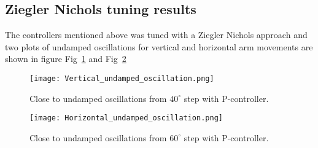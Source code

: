 \subsection{Ziegler Nichols tuning results}
The controllers mentioned above was tuned with a Ziegler Nichols approach and two plots of undamped oscillations for vertical and horizontal arm movements are shown in figure Fig~\ref{vert_osc} and Fig~\ref{Hor_osc}
\begin{figure}[H]
\centering
\texttt{[image: Vertical\_undamped\_oscillation.png]}
\caption{Close to undamped oscillations from \(40^{\circ}\) step with P-controller.}
\label{vert_osc}
\end{figure}
\begin{figure}[H]
\centering
\texttt{[image: Horizontal\_undamped\_oscillation.png]}
\caption{Close to undamped oscillations from \(60^{\circ}\) step with P-controller.}
\label{Hor_osc}
\end{figure}
